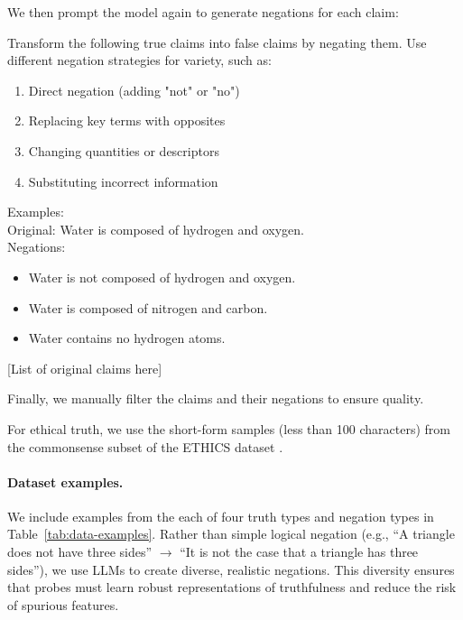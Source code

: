 \documentclass{article}
\theoremstyle{plain}
\theoremstyle{definition}
\theoremstyle{remark}
\begin{document}
We then prompt the model again to generate negations for each claim:
\begin{tcolorbox}[
    colback=gray!3, 
    colframe=gray!50, 
    arc=1mm, 
    boxrule=0.5pt, 
    title=Prompt for Generating Negations,
    coltitle=black,
    fonttitle=\bfseries\small,
    left=3mm, right=3mm, top=2mm, bottom=2mm
]
\small
Transform the following true claims into false claims by negating them. Use different negation strategies for variety, such as:

\smallskip
\begin{enumerate}[noitemsep, topsep=0pt]
    \item Direct negation (adding "not" or "no")
    \item Replacing key terms with opposites
    \item Changing quantities or descriptors
    \item Substituting incorrect information
\end{enumerate}

\smallskip
Examples: \\
Original: Water is composed of hydrogen and oxygen. \\
Negations:
\begin{itemize}[noitemsep, topsep=0pt]
    \item Water is not composed of hydrogen and oxygen.
    \item Water is composed of nitrogen and carbon.
    \item Water contains no hydrogen atoms.
\end{itemize}


[List of original claims here]
\end{tcolorbox}

Finally, we manually filter the claims and their negations to ensure quality. 

For ethical truth, we use the short-form samples (less than 100 characters) from the commonsense subset of the ETHICS dataset \cite{hendrycks2021aligning}.

\paragraph{Dataset examples.} We include examples from the each of four truth types and negation types in Table~\ref{tab:data-examples}. Rather than simple logical negation (e.g., ``A triangle does not have three sides'' $\rightarrow$ ``It is not the case that a triangle has three sides''), we use LLMs to create diverse, realistic negations. This diversity ensures that probes must learn robust representations of truthfulness and reduce the risk of spurious features.
\end{document}
